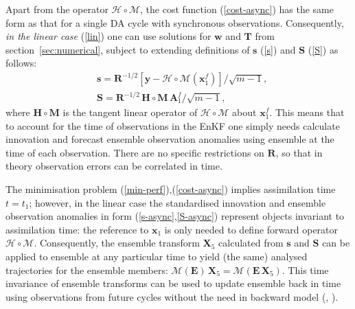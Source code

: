 \documentclass[11pt]{report}
\newcommand{\mb} {\mathbf}
\begin{document}
Apart from the operator $\mathcal H \circ \mathcal M$, the cost function (\ref{cost-async}) has the same form as that for a single DA cycle with synchronous observations.
Consequently, \emph{in the linear case} (\ref{lin}) one can use solutions for $\mb w$ and $\mb T$ from section~\ref{sec:numerical}, subject to extending definitions of $\mb s$ (\ref{s}) and $\mb S$ (\ref{S}) as follows:
\begin{align}
  \label{s-async}
  &\mb s = \mb R^{-1/2} \left[ \mb y - \mathcal H \circ \mathcal M (\mb x_1^f) \right] / \sqrt{m - 1},\\
  \label{S-async}
  &\mb S = \mb R^{-1/2} \, \mb H \circ \mb M \, \mb A_1^f / \sqrt{m - 1},
\end{align}
where $\mb H \circ \mb M$ is the tangent linear operator of $\mathcal H \circ \mathcal M$ about $\mb x_1^f$.
This means that to account for the time of observations in the EnKF one simply needs calculate innovation and forecast ensemble observation anomalies using ensemble at the time of each observation.
There are no specific restrictions on $\mb R$, so that in theory observation errors can be correlated in time.

The minimisation problem (\ref{min-perf}),(\ref{cost-async}) implies assimilation time $t = t_1$; however, in the linear case the standardised innovation and ensemble observation anomalies in form (\ref{s-async},\ref{S-async}) represent objects invariant to assimilation time: the reference to $\mb x_1$ is only needed to define forward operator $\mathcal H \circ \mathcal M$.
Consequently, the ensemble transform $\mb X_5$ calculated from $\mb s$ and $\mb S$ can be applied to ensemble at any particular time to yield (the same) analysed trajectories for the ensemble members: $\mathcal M (\mb E) \, \mb X_5 = \mathcal M (\mb E \, \mb X_5)$.
This time invariance of ensemble transforms can be used to update ensemble back in time using observations from future cycles without the need in backward model (\citealt[][sec.~6]{eve00a}, \citealt[][app.~D]{eve03a}).
\end{document}
